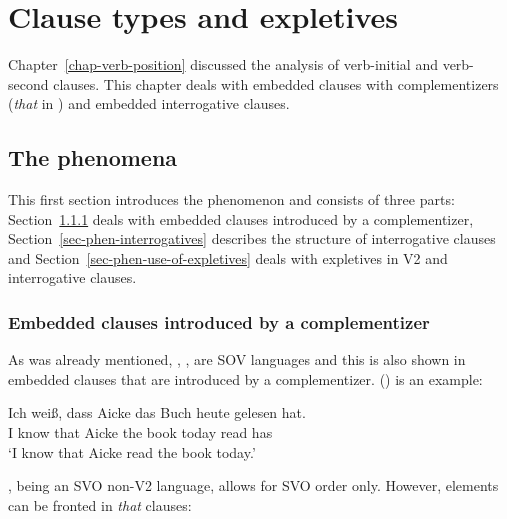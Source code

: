 \chapter{Clause types and expletives}
\label{chap-expletives}


Chapter~\ref{chap-verb-position} discussed the analysis of verb-initial and verb-second clauses. This chapter deals
with embedded clauses with complementizers (\eg \emph{that} in ) and embedded interrogative
clauses. 


\section{The phenomena}


This first section introduces the phenomenon and consists of three parts: Section~\ref{sec-complementizer} deals with embedded
clauses introduced by a complementizer, Section~\ref{sec-phen-interrogatives} describes the
structure of interrogative clauses and Section~\ref{sec-phen-use-of-expletives} deals with expletives in V2 and interrogative clauses.


\subsection{Embedded clauses introduced by a complementizer}
\label{sec-complementizer}

As was already mentioned, , ,  are SOV languages and this is also shown in embedded
clauses that are introduced by a complementizer. () is an example:

\ea
\gll Ich weiß, dass Aicke das Buch heute gelesen hat.\\
     I know that Aicke the book today read has\\\german
\glt `I know that Aicke read the book today.'
\z



\noindent
{}, being an SVO non-V2 language, allows for SVO order only.
\z
However, elements can be fronted in \emph{that} clauses:
\eal
{}
\zl

